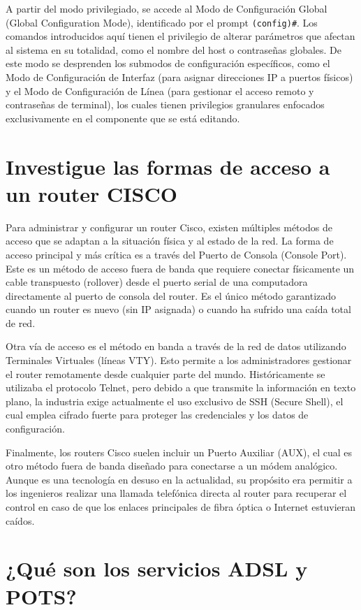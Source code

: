 \documentclass[a4paper,12pt]{article}
\begin{document}
A partir del modo privilegiado, se accede al Modo de Configuración Global (Global Configuration Mode), identificado por el prompt \texttt{(config)\#}. Los comandos introducidos aquí tienen el privilegio de alterar parámetros que afectan al sistema en su totalidad, como el nombre del host o contraseñas globales. De este modo se desprenden los submodos de configuración específicos, como el Modo de Configuración de Interfaz (para asignar direcciones IP a puertos físicos) y el Modo de Configuración de Línea (para gestionar el acceso remoto y contraseñas de terminal), los cuales tienen privilegios granulares enfocados exclusivamente en el componente que se está editando.

\section{Investigue las formas de acceso a un router CISCO}

Para administrar y configurar un router Cisco, existen múltiples métodos de acceso que se adaptan a la situación física y al estado de la red. La forma de acceso principal y más crítica es a través del Puerto de Consola (Console Port). Este es un método de acceso fuera de banda que requiere conectar físicamente un cable transpuesto (rollover) desde el puerto serial de una computadora directamente al puerto de consola del router. Es el único método garantizado cuando un router es nuevo (sin IP asignada) o cuando ha sufrido una caída total de red.

Otra vía de acceso es el método en banda a través de la red de datos utilizando Terminales Virtuales (líneas VTY). Esto permite a los administradores gestionar el router remotamente desde cualquier parte del mundo. Históricamente se utilizaba el protocolo Telnet, pero debido a que transmite la información en texto plano, la industria exige actualmente el uso exclusivo de SSH (Secure Shell), el cual emplea cifrado fuerte para proteger las credenciales y los datos de configuración.

Finalmente, los routers Cisco suelen incluir un Puerto Auxiliar (AUX), el cual es otro método fuera de banda diseñado para conectarse a un módem analógico. Aunque es una tecnología en desuso en la actualidad, su propósito era permitir a los ingenieros realizar una llamada telefónica directa al router para recuperar el control en caso de que los enlaces principales de fibra óptica o Internet estuvieran caídos.

\section{¿Qué son los servicios ADSL y POTS?}
\end{document}
